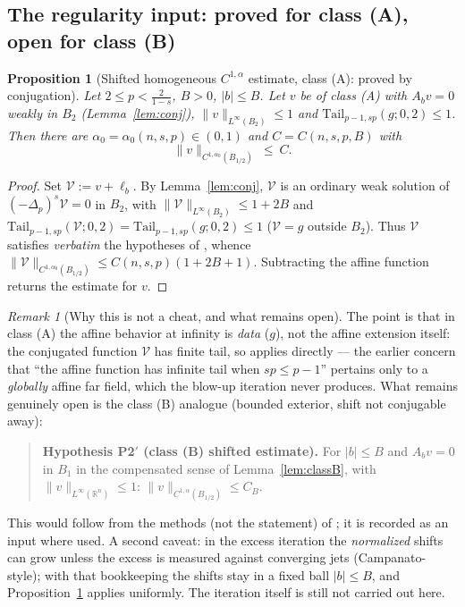 \documentclass[11pt]{amsart}
\theoremstyle{plain}
\newtheorem{proposition}[theorem]{Proposition}
\theoremstyle{definition}
\theoremstyle{remark}
\newtheorem{remark}[theorem]{Remark}
\newcommand{\R}{\mathbb{R}}
\newcommand{\fpl}[1]{(-\Delta_p)^{s}#1}
\newcommand{\al}{\alpha}
\newcommand{\Tail}{\mathrm{Tail}_{p-1,sp}}
\begin{document}
\subsection{The regularity input: proved for class (A), open for class (B)}

\begin{proposition}[Shifted homogeneous $C^{1,\al}$ estimate, class
\textnormal{(A)}: proved by conjugation]\label{prop:P2A}
Let $2\le p<\frac2{1-s}$, $B>0$, $|b|\le B$. Let $v$ be of class
\textnormal{(A)} with $A_bv=0$ weakly in $B_2$
\textnormal{(}Lemma~\ref{lem:conj}\textnormal{)},
$\|v\|_{L^\infty(B_2)}\le1$ and $\Tail(g;0,2)\le1$. Then there are
$\al_0=\al_0(n,s,p)\in(0,1)$ and $C=C(n,s,p,B)$ with
\[
  \|v\|_{C^{1,\al_0}(B_{1/2})}\ \le\ C .
\]
\end{proposition}
\begin{proof}
Set $\mathcal V:=v+\ell_b$. By Lemma~\ref{lem:conj}, $\mathcal V$ is an
ordinary weak solution of $\fpl{\mathcal V}=0$ in $B_2$, with
$\|\mathcal V\|_{L^\infty(B_2)}\le 1+2B$ and
$\Tail(\mathcal V;0,2)=\Tail(g;0,2)\le1$ \textnormal{(}$\mathcal V=g$
outside $B_2$\textnormal{)}. Thus $\mathcal V$ satisfies \emph{verbatim} the
hypotheses of \cite[Theorem~1.1]{GJS}, whence
$\|\mathcal V\|_{C^{1,\al_0}(B_{1/2})}\le C(n,s,p)(1+2B+1)$. Subtracting the
affine function returns the estimate for $v$.
\end{proof}

\begin{remark}[Why this is not a cheat, and what remains open]
\label{rem:P2status}
The point is that in class \textnormal{(A)} the affine behavior at infinity
is \emph{data} ($g$), not the affine extension itself: the conjugated
function $\mathcal V$ has finite tail, so \cite[Thm~1.1]{GJS} applies
directly --- the earlier concern that ``the affine function has infinite
tail when $sp\le p-1$'' pertains only to a \emph{globally} affine far field,
which the blow-up iteration never produces. What remains genuinely open is
the class \textnormal{(B)} analogue \textnormal{(}bounded exterior, shift
not conjugable away\textnormal{)}:
\begin{quote}
\textbf{Hypothesis P2$'$ (class (B) shifted estimate).} For $|b|\le B$ and
$A_bv=0$ in $B_1$ in the compensated sense of Lemma~\ref{lem:classB}, with
$\|v\|_{L^\infty(\R^n)}\le1$: $\|v\|_{C^{1,\al}(B_{1/2})}\le C_B$.
\end{quote}
This would follow from the methods (not the statement) of \cite{GJS}; it is
recorded as an input where used. A second caveat: in the excess iteration
the \emph{normalized} shifts can grow unless the excess is measured against
converging jets (Campanato-style); with that bookkeeping the shifts stay in
a fixed ball $|b|\le B$, and Proposition~\ref{prop:P2A} applies uniformly.
The iteration itself is still not carried out here.
\end{remark}
\end{document}
